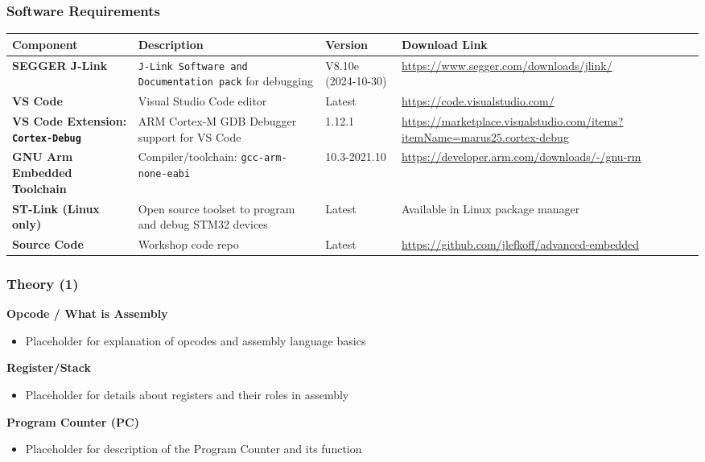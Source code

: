 \documentclass{beamer}
\begin{document}
\begin{frame}
    \frametitle{Software Requirements}
    \footnotesize
    \vspace{-0.5cm}
    \begin{table}[]
        \begin{tabular}{|p{2cm}|p{3cm}|p{1cm}|p{3.5cm}|}
            \hline
            \textbf{Component} & \textbf{Description} & \textbf{Version} & \textbf{Download Link} \\ \hline
            \textbf{SEGGER J-Link} & \texttt{J-Link Software and Documentation pack} for debugging & V8.10e (2024-10-30) & \url{https://www.segger.com/downloads/jlink/} \\ \hline
            \textbf{VS Code} & Visual Studio Code editor & Latest & \url{https://code.visualstudio.com/} \\ \hline
            \textbf{VS Code Extension: \texttt{Cortex-Debug}} & ARM Cortex-M GDB Debugger support for VS Code & 1.12.1 & \url{https://marketplace.visualstudio.com/items?itemName=marus25.cortex-debug} \\ \hline
            \textbf{GNU Arm Embedded Toolchain} & Compiler/toolchain: \texttt{gcc-arm-none-eabi} & 10.3-2021.10 & \url{https://developer.arm.com/downloads/-/gnu-rm} \\ \hline
            \textbf{ST-Link (Linux only)} & Open source toolset to program and debug STM32 devices & Latest & Available in Linux package manager \\ \hline
            \textbf{Source Code} & Workshop code repo & Latest & \url{https://github.com/jlefkoff/advanced-embedded} \\ \hline
        \end{tabular}
    \end{table}
\end{frame}

\begin{frame}
    \frametitle{Theory (1)}
    \textbf{Opcode / What is Assembly}
    \begin{itemize}
        \item Placeholder for explanation of opcodes and assembly language basics
    \end{itemize}

    \textbf{Register/Stack}
    \begin{itemize}
        \item Placeholder for details about registers and their roles in assembly
    \end{itemize}

    \textbf{Program Counter (PC)}
    \begin{itemize}
        \item Placeholder for description of the Program Counter and its function
    \end{itemize}
\end{frame}
\end{document}
